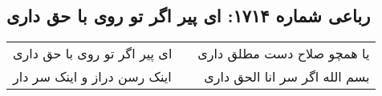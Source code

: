 \begin{center}
\section*{رباعی شماره ۱۷۱۴: ای پیر اگر تو روی با حق داری}
\label{sec:1714}
\begin{longtable}{l p{0.5cm} r}
ای پیر اگر تو روی با حق داری
&&
یا همچو صلاح دست مطلق داری
\\
اینک رسن دراز و اینک سر دار
&&
بسم الله اگر سر انا الحق داری
\\
\end{longtable}
\end{center}
